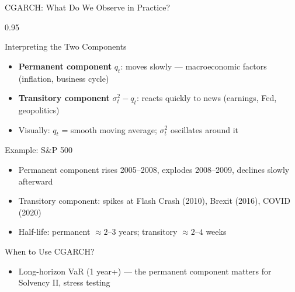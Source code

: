 \documentclass[9pt, aspectratio=169, t]{beamer}
\begin{document}
\begin{frame}{CGARCH: What Do We Observe in Practice?}
    \begin{cminipage}{0.95\textwidth}
    {\footnotesize
    \vspace{-0.2cm}
        \begin{block}{Interpreting the Two Components}
            \begin{itemize}\setlength{\itemsep}{0pt}
                \item \textbf{Permanent component} $q_t$: moves slowly --- macroeconomic factors (inflation, business cycle)
                \item \textbf{Transitory component} $\sigma_t^2 - q_t$: reacts quickly to news (earnings, Fed, geopolitics)
                \item Visually: $q_t$ = smooth moving average; $\sigma_t^2$ oscillates around it
            \end{itemize}
        \end{block}
        \vspace{-1mm}
        \begin{exampleblock}{Example: S\&P 500}
            \begin{itemize}\setlength{\itemsep}{0pt}
                \item Permanent component rises 2005--2008, explodes 2008--2009, declines slowly afterward
                \item Transitory component: spikes at Flash Crash (2010), Brexit (2016), COVID (2020)
                \item Half-life: permanent $\approx 2$--$3$ years; transitory $\approx 2$--$4$ weeks
            \end{itemize}
        \end{exampleblock}
        \vspace{-1mm}
        \begin{alertblock}{When to Use CGARCH?}
            \begin{itemize}\setlength{\itemsep}{0pt}
                \item Long-horizon VaR (1 year+) --- the permanent component matters for Solvency II, stress testing
            \end{itemize}
        \end{alertblock}
    }
    \end{cminipage}
\end{frame}
\end{document}
